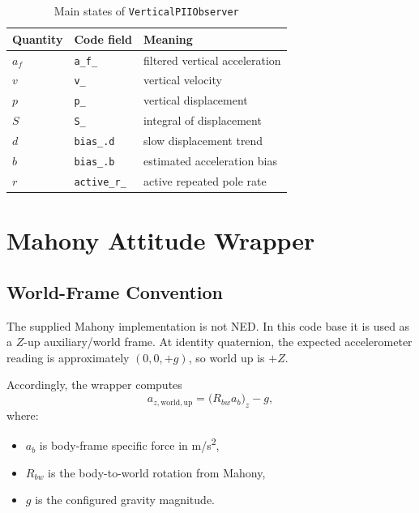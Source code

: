 \documentclass[conference]{IEEEtran}
\begin{document}
\begin{table}[t]
  \centering
  \caption{Main states of \texttt{VerticalPIIObserver}}
  \label{tab:pii_states}
  \small
  \begin{tabular}{@{}lll@{}}
    \toprule
    Quantity & Code field & Meaning \\
    \midrule
    \(a_f\) & \texttt{a\_f\_} & filtered vertical acceleration \\
    \(v\)   & \texttt{v\_}    & vertical velocity \\
    \(p\)   & \texttt{p\_}    & vertical displacement \\
    \(S\)   & \texttt{S\_}    & integral of displacement \\
    \(d\)   & \texttt{bias\_.d} & slow displacement trend \\
    \(b\)   & \texttt{bias\_.b} & estimated acceleration bias \\
    \(r\)   & \texttt{active\_r\_} & active repeated pole rate \\
    \bottomrule
  \end{tabular}
\end{table}

\section{Mahony Attitude Wrapper}\label{sec:mahony}

\subsection{World-Frame Convention}

The supplied Mahony implementation is not NED. In this code base it is used
as a \(Z\)-up auxiliary/world frame. At identity quaternion, the expected
accelerometer reading is approximately \((0,0,+g)\), so world up is \(+Z\).

Accordingly, the wrapper computes
\begin{equation}
a_{z,\mathrm{world,up}}
=
\bigl(R_{bw} a_b\bigr)_z - g,
\end{equation}
where:
\begin{itemize}[leftmargin=1.4em]
  \item \(a_b\) is body-frame specific force in \si{m/s^2},
  \item \(R_{bw}\) is the body-to-world rotation from Mahony,
  \item \(g\) is the configured gravity magnitude.
\end{itemize}
\end{document}
